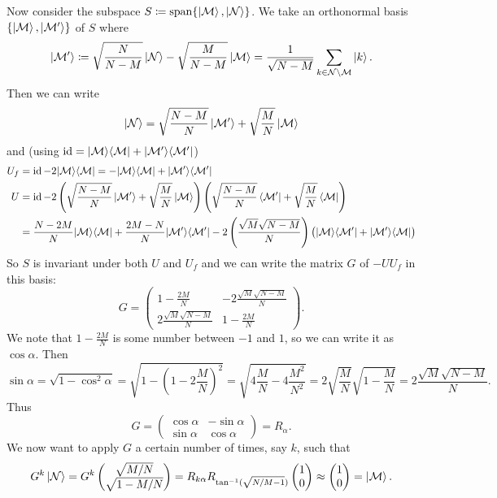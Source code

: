Now consider the subspace $S \coloneqq \operatorname{span}\{\left| \mathcal{M} \right\rangle, \left| \mathcal{N} \right\rangle\}$. We take an orthonormal basis $\{\left| \mathcal{M} \right\rangle, \left| \mathcal{M}' \right\rangle\}$ of $S$ where
\[ \left| \mathcal{M}' \right\rangle \coloneqq \sqrt{\frac{N}{N-M}}\left| \mathcal{N} \right\rangle - \sqrt{\frac{M}{N-M}}\left| \mathcal{M} \right\rangle = \frac{1}{\sqrt{N-M}}\sum_{k\in \mathcal{N}\setminus\mathcal{M}}\left| k \right\rangle. \]
Then we can write
\[ \left| \mathcal{N} \right\rangle = \sqrt{\frac{N-M}{N}}\left| \mathcal{M}' \right\rangle+ \sqrt{\frac{M}{N}}\left| \mathcal{M} \right\rangle \]
and (using $\operatorname{id} = |\mathcal{M}\rangle\langle\mathcal{M}| + |\mathcal{M}'\rangle\langle\mathcal{M}'|$)
\begin{align*}
U_f &= \operatorname{id} - 2 |\mathcal{M}\rangle\langle\mathcal{M}| = - |\mathcal{M}\rangle\langle\mathcal{M}| + |\mathcal{M}'\rangle\langle\mathcal{M}'| \\
U &= \operatorname{id} - 2\left(\sqrt{\frac{N-M}{N}}\left| \mathcal{M}' \right\rangle+ \sqrt{\frac{M}{N}}\left| \mathcal{M} \right\rangle\right)\left(\sqrt{\frac{N-M}{N}}\left\langle \mathcal{M}' \right|+ \sqrt{\frac{M}{N}}\left\langle \mathcal{M} \right|\right) \\
&= \frac{N-2M}{N}|\mathcal{M}\rangle\langle\mathcal{M}| + \frac{2M-N}{N}|\mathcal{M}'\rangle\langle\mathcal{M}'| - 2\left(\frac{\sqrt{M}\sqrt{N-M}}{N}\right)\big(|\mathcal{M}\rangle\langle\mathcal{M}'| +  |\mathcal{M}'\rangle\langle\mathcal{M}|\big)
\end{align*}
So $S$ is invariant under both $U$ and $U_f$ and we can write the matrix $G$ of $-UU_f$ in this basis:
\[ G = \begin{pmatrix}
1 - \frac{2M}{N} & -2 \frac{\sqrt{M}\sqrt{N-M}}{N} \\
2 \frac{\sqrt{M}\sqrt{N-M}}{N} & 1 - \frac{2M}{N}
\end{pmatrix}. \]
We note that $1 - \frac{2M}{N}$ is some number between $-1$ and $1$, so we can write it as $\cos\alpha$. Then
\[ \sin\alpha = \sqrt{1- \cos^2\alpha} = \sqrt{1 - \left(1-2 \frac{M}{N}\right)^2} = \sqrt{4 \frac{M}{N} - 4 \frac{M^2}{N^2}} = 2\sqrt{\frac{M}{N}}\sqrt{1- \frac{M}{N}} = 2 \frac{\sqrt{M}\sqrt{N-M}}{N}. \]
Thus
\[ G = \begin{pmatrix}
\cos\alpha & -\sin\alpha \\
\sin\alpha & \cos\alpha
\end{pmatrix} = R_\alpha. \]
We now want to apply $G$ a certain number of times, say $k$, such that
\[ G^k\left| \mathcal{N} \right\rangle = G^k \begin{pmatrix}
\sqrt{M/N} \\ \sqrt{1 - M/N}
\end{pmatrix} = R_{k\alpha}R_{\tan^{-1}(\sqrt{N/M - 1})} \begin{pmatrix}
1 \\ 0
\end{pmatrix} \approx \begin{pmatrix}
1 \\ 0
\end{pmatrix} = \left| \mathcal{M} \right\rangle. \]

